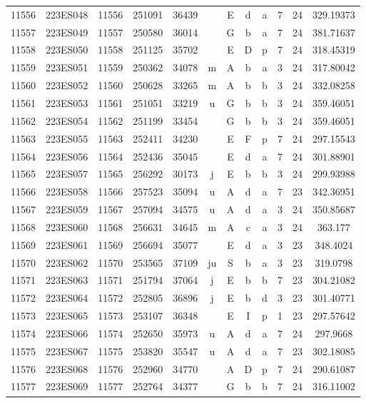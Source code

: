\begin{tabular}{|*{12}{c|}}
11556 & 223ES048 & 11556 & 251091 & 36439 &  & E & d & a & 7 & 24 & 329.19373 \\ 
11557 & 223ES049 & 11557 & 250580 & 36014 &  & G & b & a & 7 & 24 & 381.71637 \\ 
11558 & 223ES050 & 11558 & 251125 & 35702 &  & E & D & p & 7 & 24 & 318.45319 \\ 
11559 & 223ES051 & 11559 & 250362 & 34078 & m & A & b & a & 3 & 24 & 317.80042 \\ 
11560 & 223ES052 & 11560 & 250628 & 33265 & m & A & b & b & 3 & 24 & 332.08258 \\ 
11561 & 223ES053 & 11561 & 251051 & 33219 & u & G & b & b & 3 & 24 & 359.46051 \\ 
11562 & 223ES054 & 11562 & 251199 & 33454 &  & G & b & b & 3 & 24 & 359.46051 \\ 
11563 & 223ES055 & 11563 & 252411 & 34230 &  & E & F & p & 7 & 24 & 297.15543 \\ 
11564 & 223ES056 & 11564 & 252436 & 35045 &  & E & d & a & 7 & 24 & 301.88901 \\ 
11565 & 223ES057 & 11565 & 256292 & 30173 & j & E & b & b & 3 & 24 & 299.93988 \\ 
11566 & 223ES058 & 11566 & 257523 & 35094 & u & A & d & a & 7 & 23 & 342.36951 \\ 
11567 & 223ES059 & 11567 & 257094 & 34575 & u & A & d & a & 3 & 24 & 350.85687 \\ 
11568 & 223ES060 & 11568 & 256631 & 34645 & m & A & c & a & 3 & 24 & 363.177 \\ 
11569 & 223ES061 & 11569 & 256694 & 35077 &  & E & d & a & 3 & 23 & 348.4024 \\ 
11570 & 223ES062 & 11570 & 253565 & 37109 & ju & S & b & a & 3 & 23 & 319.0798 \\ 
11571 & 223ES063 & 11571 & 251794 & 37064 & j & E & b & b & 7 & 23 & 304.21082 \\ 
11572 & 223ES064 & 11572 & 252805 & 36896 & j & E & b & d & 3 & 23 & 301.40771 \\ 
11573 & 223ES065 & 11573 & 253107 & 36348 &  & E & I & p & 1 & 23 & 297.57642 \\ 
11574 & 223ES066 & 11574 & 252650 & 35973 & u & A & d & a & 7 & 24 & 297.9668 \\ 
11575 & 223ES067 & 11575 & 253820 & 35547 & u & A & d & a & 7 & 23 & 302.18085 \\ 
11576 & 223ES068 & 11576 & 252960 & 34770 &  & A & D & p & 7 & 24 & 290.61087 \\ 
11577 & 223ES069 & 11577 & 252764 & 34377 &  & G & b & b & 7 & 24 & 316.11002 \\ 

\end{tabular}
